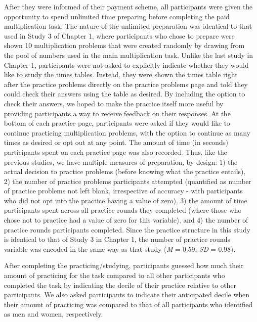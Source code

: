 \documentclass[a4paper, nobind]{templates/ociamthesis}
\begin{document}
After they were informed of their payment scheme, all participants were given the opportunity to spend unlimited time preparing before completing the paid multiplication task. The nature of the unlimited preparation was identical to that used in Study 3 of Chapter 1, where participants who chose to prepare were shown 10 multiplication problems that were created randomly by drawing from the pool of numbers used in the main multiplication task. Unlike the last study in Chapter 1, participants were not asked to explicitly indicate whether they would like to study the times tables. Instead, they were shown the times table right after the practice problems directly on the practice problems page and told they could check their answers using the table as desired. By including the option to check their answers, we hoped to make the practice itself more useful by providing participants a way to receive feedback on their responses. At the bottom of each practice page, participants were asked if they would like to continue practicing multiplication problems, with the option to continue as many times as desired or opt out at any point. The amount of time (in seconds) participants spent on each practice page was also recorded. Thus, like the previous studies, we have multiple measures of preparation, by design: 1) the actual decision to practice problems (before knowing what the practice entails), 2) the number of practice problems participants attempted (quantified as number of practice problems not left blank, irrespective of accuracy - with participants who did not opt into the practice having a value of zero), 3) the amount of time participants spent across all practice rounds they completed (where those who chose not to practice had a value of zero for this variable), and 4) the number of practice rounds participants completed. Since the practice structure in this study is identical to that of Study 3 in Chapter 1, the number of practice rounds variable was encoded in the same way as that study (\emph{M} = 0.59, \emph{SD} = 0.98).

After completing the practicing/studying, participants guessed how much their amount of practicing for the task compared to all other participants who completed the task by indicating the decile of their practice relative to other participants. We also asked participants to indicate their anticipated decile when their amount of practicing was compared to that of all participants who identified as men and women, respectively.
\end{document}
